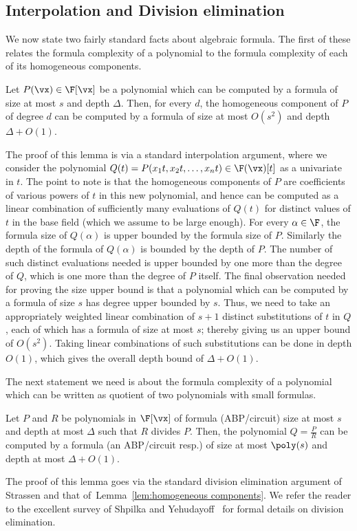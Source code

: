 \subsection{Interpolation and Division elimination}
We now state two fairly standard facts about algebraic formula.  The first of these relates the formula complexity of a polynomial to the formula complexity of each of its homogeneous components.  
\begin{lemma}\label{lem:homogeneous components}
Let $P(\vx) \in \F[\vx]$ be a polynomial which can be computed by a formula of size at most $s$ and depth $\Delta$. Then, for every $d$, the homogeneous component of $P$ of degree $d$ can be computed by a formula of size at most $O(s^2)$ and depth $\Delta+O(1)$.  
\end{lemma}
The proof of this lemma is via a standard interpolation argument, where we consider the polynomial $Q(t) = P(x_1t, x_2t, \ldots, x_nt) \in \F(\vx)[t]$ as a univariate in $t$. The point to note is that the homogeneous components of $P$ are coefficients of various powers of $t$ in this new polynomial, and hence can be computed as a linear combination of sufficiently many evaluations of $Q(t)$ for distinct values of $t$ in the base field (which we assume to be large enough). For every $\alpha \in \F$, the formula size of $Q(\alpha)$ is upper bounded by the formula size of $P$. Similarly the depth of the formula of $Q(\alpha)$ is bounded by the depth of $P$. The number of such distinct evaluations needed is upper bounded by one more than the degree of $Q$, which is one more than the degree of $P$ itself. The final observation needed for proving the size upper bound is that a polynomial which can be computed by a formula of size $s$ has degree upper bounded by $s$. Thus, we need to take an appropriately weighted linear combination of $s+1$ distinct substitutions of $t$ in $Q$, each of which has a formula of size at most $s$; thereby giving us an upper bound of $O(s^2)$. Taking linear combinations of such substitutions can be done in depth $O(1)$, which gives the overall depth bound of $\Delta+O(1)$. 

The next statement we need is about the formula complexity of a polynomial which can be written as quotient of two polynomials with small formulas. 
\begin{lemma}\label{lem:division of formulas}
Let $P$ and $R$ be polynomials in $\F[\vx]$ of formula (ABP/circuit) size at most $s$ and depth at most $\Delta$ such that $R$ divides $P$. Then, the polynomial $Q = \frac{P}{R}$ can be computed by a formula (an ABP/circuit resp.) of size at most $\poly(s)$ and depth at most $\Delta+O(1)$. 
\end{lemma}
The proof of this lemma goes via the standard division elimination argument of Strassen and that of~Lemma~\ref{lem:homogeneous components}. We refer the reader to the excellent survey of Shpilka and Yehudayoff~\cite{r37} for formal details on division elimination.

